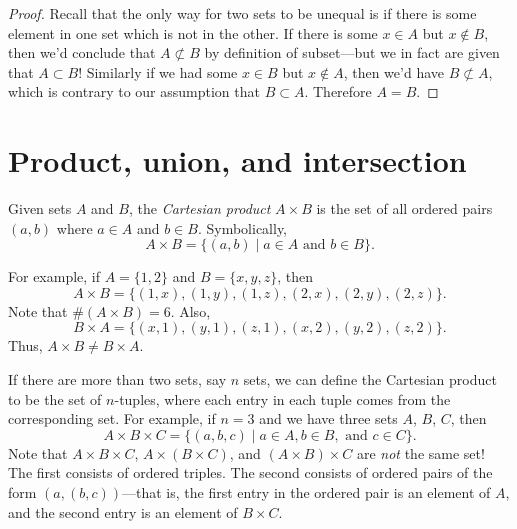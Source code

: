 \documentclass{tufte-book}
\begin{document}
\begin{proof}
  Recall that the only way for two sets to be unequal is if there is some element in one set which is not in the other. If there is some $x \in A$ but $x \notin B$, then we'd conclude that $A \not\subset B$ by definition of subset---but we in fact are given that $A \subset B$! Similarly if we had some $x \in B$ but $x \notin A$, then we'd have $B \not\subset A$, which is contrary to our assumption that $B \subset A$. Therefore $A = B$.
\end{proof}



\section{Product, union, and intersection}
\label{sec:prod-union-inters}

\begin{definition}
  Given sets $A$ and $B$, the \emph{Cartesian product}  $A \times B$ is the set of all ordered pairs $(a, b)$ where $a \in A$ and $b \in B$. Symbolically,
  \[
  A \times B = \{(a,b) \mid a \in A \text{ and } b \in B\}.
  \]
\end{definition}
For example, if $A = \{1, 2\}$ and $B = \{x, y, z\}$, then
\[
A \times B = \{(1, x), (1, y), (1, z), (2, x), (2, y), (2, z)\}.
\]
Note that $\#(A \times B) = 6$. Also,
\[
B \times A = \{(x, 1), (y, 1), (z, 1), (x, 2), (y, 2), (z, 2)\}.
\]
Thus, $A \times B \neq B \times A$.

If there are more than two sets, say $n$ sets, we can define the Cartesian product to be the set of $n$-tuples, where each entry in each tuple comes from the corresponding set. For example, if $n = 3$ and we have three sets $A$, $B$, $C$, then
\[
A \times B \times C = \{(a, b, c) \mid a \in A, b \in B, \text{ and } c \in C\}.
\]
Note that $A \times B \times C$, $A \times (B \times C)$, and $(A \times B) \times C$ are \emph{not} the same set! The first consists of ordered triples. The second consists of ordered pairs of the form $(a, (b, c))$---that is, the first entry in the ordered pair is an element of $A$, and the second entry is an element of $B \times C$.
\end{document}
